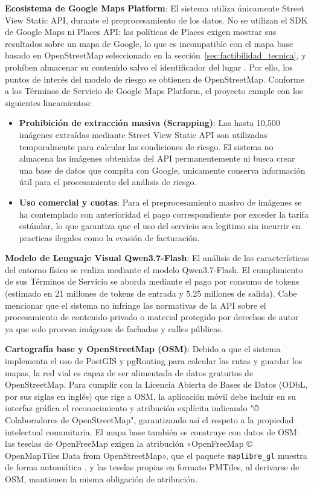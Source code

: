 \textbf{Ecosistema de Google Maps Platform}: El sistema utiliza únicamente Street View Static API, durante el preprocesamiento de los datos. No se utilizan el SDK de Google Maps ni Places API: las políticas de Places exigen mostrar sus resultados sobre un mapa de Google, lo que es incompatible con el mapa base basado en OpenStreetMap seleccionado en la sección~\ref{sec:factibilidad_tecnica}, y prohíben almacenar su contenido salvo el identificador del lugar \cite{google_places_policies}. Por ello, los puntos de interés del modelo de riesgo se obtienen de OpenStreetMap. Conforme a los Términos de Servicio de Google Maps Platform, el proyecto cumple con los siguientes lineamientos:

\begin{itemize}
    \item\textbf{Prohibición de extracción masiva (Scrapping)}: Las hasta 10,500 imágenes extraídas mediante Street View Static API son utilizadas temporalmente para calcular las condiciones de riesgo. El sistema no almacena las imágenes obtenidas del API permanentemente ni busca crear una base de datos que compita con Google, unicamente conserva información útil para el procesamiento del análisis de riesgo.
    \item\textbf{Uso comercial y cuotas}: Para el preprocesamiento masivo de imágenes se ha contemplado con anterioridad el pago correspondiente por exceder la tarifa estándar, lo que garantiza que el uso del servicio sea legitimo sin incurrir en practicas ilegales como la evasión de facturación.
\end{itemize}

\textbf{Modelo de Lenguaje Visual Qwen3.7-Flash}: El análisis de las características del entorno físico se realiza mediante el modelo Qwen3.7-Flash. El cumplimiento de sus Términos de Servicio se aborda mediante el pago por consumo de tokens (estimado en 21 millones de tokens de entrada y 5.25 millones de salida). Cabe mencionar que el sistema no infringe las normativas de la API sobre el procesamiento de contenido privado o material protegido por derechos de autor ya que solo procesa imágenes de fachadas y calles públicas. 

\textbf{Cartografía base y OpenStreetMap (OSM)}: Debido a que el sistema implementa el uso de PostGIS y pgRouting para calcular las rutas y guardar los mapas, la red vial es capaz de ser alimentada de datos gratuitos de OpenStreetMap. Para cumplir con la Licencia Abierta de Bases de Datos (ODbL, por sus siglas en inglés) que rige a OSM, la aplicación móvil debe incluir en su interfaz gráfica el reconocimiento y atribución explícita indicando "© Colaboradores de OpenStreetMap", garantizando así el respeto a la propiedad intelectual comunitaria. El mapa base también se construye con datos de OSM: las teselas de OpenFreeMap exigen la atribución «OpenFreeMap © OpenMapTiles Data from OpenStreetMap», que el paquete \texttt{maplibre\_gl} muestra de forma automática \cite{openfreemap}, y las teselas propias en formato PMTiles, al derivarse de OSM, mantienen la misma obligación de atribución.

